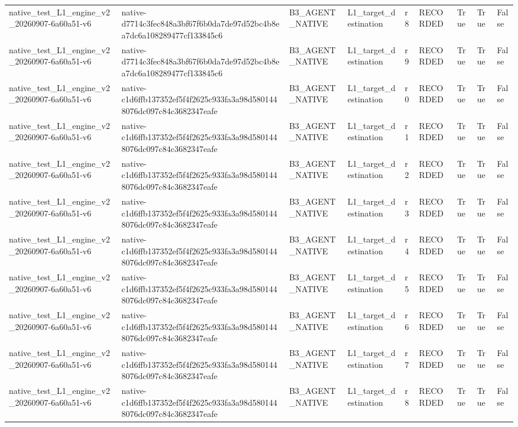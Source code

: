 \begin{tabular}{lllllllll}
native\_test\_L1\_engine\_v2\_20260907-6a60a51-v6 & native-d7714c3fec848a3bf67f6b0da7de97d52bc4b8ea7dc6a108289477cf133845c6 & B3\_AGENT\_NATIVE & L1\_target\_destination & r8 & RECORDED & True & True & False \\
native\_test\_L1\_engine\_v2\_20260907-6a60a51-v6 & native-d7714c3fec848a3bf67f6b0da7de97d52bc4b8ea7dc6a108289477cf133845c6 & B3\_AGENT\_NATIVE & L1\_target\_destination & r9 & RECORDED & True & True & False \\
native\_test\_L1\_engine\_v2\_20260907-6a60a51-v6 & native-c1d6ffb137352ef5f4f2625c933fa3a98d5801448076dc097c84c3682347eafe & B3\_AGENT\_NATIVE & L1\_target\_destination & r0 & RECORDED & True & True & False \\
native\_test\_L1\_engine\_v2\_20260907-6a60a51-v6 & native-c1d6ffb137352ef5f4f2625c933fa3a98d5801448076dc097c84c3682347eafe & B3\_AGENT\_NATIVE & L1\_target\_destination & r1 & RECORDED & True & True & False \\
native\_test\_L1\_engine\_v2\_20260907-6a60a51-v6 & native-c1d6ffb137352ef5f4f2625c933fa3a98d5801448076dc097c84c3682347eafe & B3\_AGENT\_NATIVE & L1\_target\_destination & r2 & RECORDED & True & True & False \\
native\_test\_L1\_engine\_v2\_20260907-6a60a51-v6 & native-c1d6ffb137352ef5f4f2625c933fa3a98d5801448076dc097c84c3682347eafe & B3\_AGENT\_NATIVE & L1\_target\_destination & r3 & RECORDED & True & True & False \\
native\_test\_L1\_engine\_v2\_20260907-6a60a51-v6 & native-c1d6ffb137352ef5f4f2625c933fa3a98d5801448076dc097c84c3682347eafe & B3\_AGENT\_NATIVE & L1\_target\_destination & r4 & RECORDED & True & True & False \\
native\_test\_L1\_engine\_v2\_20260907-6a60a51-v6 & native-c1d6ffb137352ef5f4f2625c933fa3a98d5801448076dc097c84c3682347eafe & B3\_AGENT\_NATIVE & L1\_target\_destination & r5 & RECORDED & True & True & False \\
native\_test\_L1\_engine\_v2\_20260907-6a60a51-v6 & native-c1d6ffb137352ef5f4f2625c933fa3a98d5801448076dc097c84c3682347eafe & B3\_AGENT\_NATIVE & L1\_target\_destination & r6 & RECORDED & True & True & False \\
native\_test\_L1\_engine\_v2\_20260907-6a60a51-v6 & native-c1d6ffb137352ef5f4f2625c933fa3a98d5801448076dc097c84c3682347eafe & B3\_AGENT\_NATIVE & L1\_target\_destination & r7 & RECORDED & True & True & False \\
native\_test\_L1\_engine\_v2\_20260907-6a60a51-v6 & native-c1d6ffb137352ef5f4f2625c933fa3a98d5801448076dc097c84c3682347eafe & B3\_AGENT\_NATIVE & L1\_target\_destination & r8 & RECORDED & True & True & False \\

\end{tabular}
